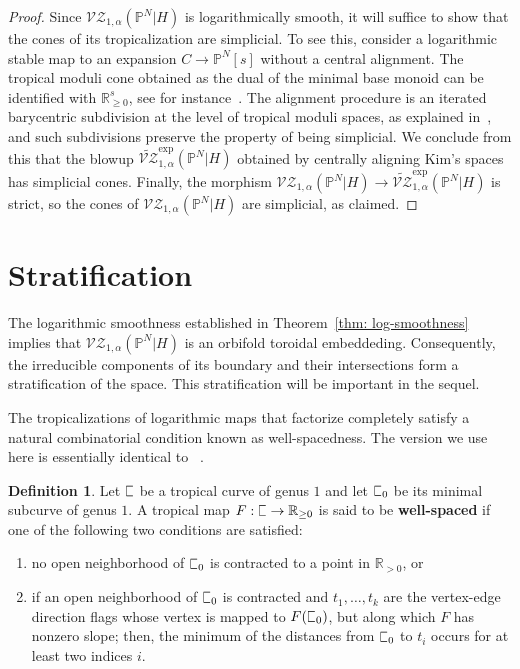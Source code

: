 \documentclass[11pt]{amsart}
\newcommand{\plC}{\scalebox{0.8}[1.3]{$\sqsubset$}}
\renewcommand{\to}{\rightarrow}
\theoremstyle{definition}
\theoremstyle{definition}
\newtheorem{definition}[thm]{Definition}
\begin{document}
\begin{proof}
Since $\mathcal{VZ}_{1,\alpha}(\mathbb P^N|H)$ is logarithmically smooth, it will suffice to show that the cones of its tropicalization are simplicial. To see this, consider a logarithmic stable map to an expansion $C\to \mathbb P^N[s]$ without a central alignment. The tropical moduli cone obtained as the dual of the minimal base monoid can be identified with $\mathbb R_{\geq 0}^{s}$, see for instance~\cite[Section~2.2]{ChenDegeneration}. The alignment procedure is an iterated barycentric subdivision at the level of tropical moduli spaces, as explained in~\cite[Section 4.6]{RSPW}, and such subdivisions preserve the property of being simplicial. We conclude from this that the blowup $\widetilde{\mathcal{VZ}}^{\mathrm{exp}}_{1,\alpha}(\mathbb P^N|H)$ obtained by centrally aligning Kim's spaces has simplicial cones. Finally, the morphism $\mathcal{VZ}_{1,\alpha}(\mathbb P^N|H)\to \widetilde{\mathcal{VZ}}^{\mathrm{exp}}_{1,\alpha}(\mathbb P^N|H)$ is strict, so the cones of $\mathcal{VZ}_{1,\alpha}(\mathbb P^N|H)$ are simplicial, as claimed.
\end{proof}

\section{Stratification} The logarithmic smoothness established in Theorem~\ref{thm: log-smoothness} implies that $\mathcal{VZ}_{1,\alpha}(\mathbb P^N|H)$ is an orbifold toroidal embeddeding. Consequently, the irreducible components of its boundary and their intersections form a stratification of the space. This stratification will be important in the sequel. 

The tropicalizations of logarithmic maps that factorize completely satisfy a natural combinatorial condition known as well-spacedness. The version we use here is essentially identical to~
\cite{RSPW2}. 

\begin{definition}
Let $\plC$ be a tropical curve of genus $1$ and let $\plC_0$ be its minimal subcurve of genus $1$. A tropical map $F: \plC\to \mathbb R_{\geq 0}$ is said to be \textbf{well-spaced} if one of the following two conditions are satisfied:
\begin{enumerate}
    \item no open neighborhood of $\plC_0$ is contracted to a point in $\mathbb R_{>0}$, or
    \item if an open neighborhood of $\plC_0$ is contracted and $t_1,\ldots,t_k$ are the vertex-edge direction flags whose vertex is mapped to $F(\plC_0)$, but along which $F$ has nonzero slope; then, the minimum of the distances from $\plC_0$ to $t_i$ occurs for at least two indices $i$.
\end{enumerate}
\end{definition}
\end{document}
